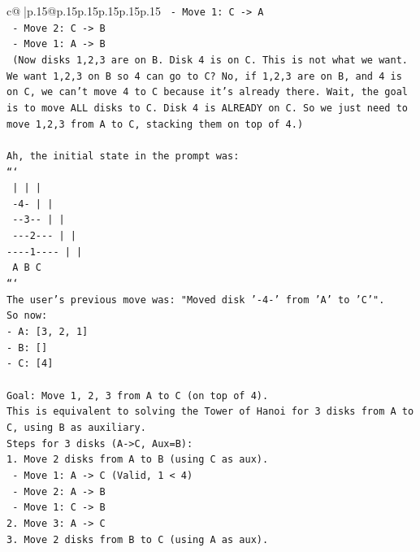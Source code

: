 \documentclass{article}
\begin{document}
{\begin{supertabular}{c@{$\;$}|p{.15\linewidth}@{}p{.15\linewidth}p{.15\linewidth}p{.15\linewidth}p{.15\linewidth}p{.15\linewidth}}
{{{\texttt{       {-} Move 1: C {-}> A} \\
\texttt{       {-} Move 2: C {-}> B} \\
\texttt{       {-} Move 1: A {-}> B} \\
\texttt{   (Now disks 1,2,3 are on B. Disk 4 is on C. This is not what we want. We want 1,2,3 on B so 4 can go to C? No, if 1,2,3 are on B, and 4 is on C, we can't move 4 to C because it's already there. Wait, the goal is to move ALL disks to C. Disk 4 is ALREADY on C. So we just need to move 1,2,3 from A to C, stacking them on top of 4.)} \\
\\ 
\texttt{Ah, the initial state in the prompt was:} \\
\texttt{```} \\
\texttt{    |         |         |    } \\
\texttt{   {-}4{-}        |         |    } \\
\texttt{  {-}{-}3{-}{-}       |         |    } \\
\texttt{ {-}{-}{-}2{-}{-}{-}      |         |    } \\
\texttt{{-}{-}{-}{-}1{-}{-}{-}{-}     |         |    } \\
\texttt{    A         B         C    } \\
\texttt{```} \\
\texttt{The user's previous move was: "Moved disk '{-}4{-}' from 'A' to 'C'".} \\
\texttt{So now:} \\
\texttt{{-} A: {[}3, 2, 1{]}} \\
\texttt{{-} B: {[}{]}} \\
\texttt{{-} C: {[}4{]}} \\
\\ 
\texttt{Goal: Move 1, 2, 3 from A to C (on top of 4).} \\
\texttt{This is equivalent to solving the Tower of Hanoi for 3 disks from A to C, using B as auxiliary.} \\
\texttt{Steps for 3 disks (A{-}>C, Aux=B):} \\
\texttt{1. Move 2 disks from A to B (using C as aux).} \\
\texttt{   {-} Move 1: A {-}> C (Valid, 1 < 4)} \\
\texttt{   {-} Move 2: A {-}> B} \\
\texttt{   {-} Move 1: C {-}> B} \\
\texttt{2. Move 3: A {-}> C} \\
\texttt{3. Move 2 disks from B to C (using A as aux).} \\
}}}
\end{supertabular}}
\end{document}
